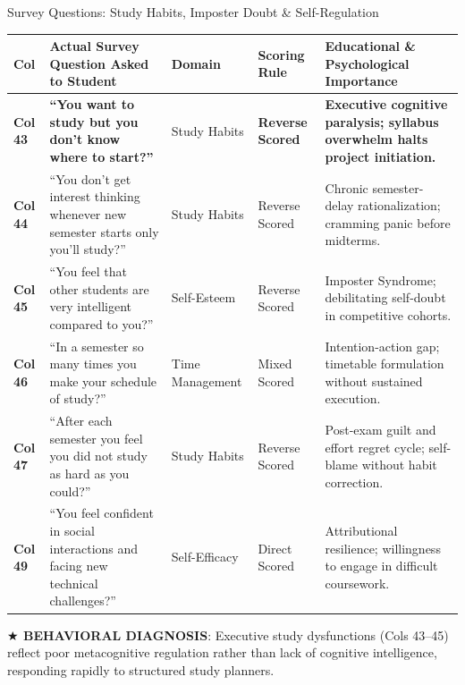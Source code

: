 \documentclass{beamer}
\begin{document}
\begin{frame}[t]{Survey Questions: Study Habits, Imposter Doubt \& Self-Regulation}
  \begin{tcolorbox}[colback=white, colframe=BlueDeep, arc=1.2mm, boxrule=0.7pt, top=0.3mm, bottom=0.3mm, left=0.8mm, right=0.8mm]
    \fontsize{4.2pt}{5.0pt}\selectfont
    \renewcommand{\arraystretch}{0.55}
    \begin{tabularx}{\linewidth}{@{}p{0.7cm} p{4.2cm} p{1.6cm} p{1.6cm} X@{}}
      \toprule
      \rowcolor{NavyDark}
      \textbf{\color{white}Col} & \textbf{\color{white}Actual Survey Question Asked to Student} & \textbf{\color{white}Domain} & \textbf{\color{white}Scoring Rule} & \textbf{\color{white}Educational \& Psychological Importance} \\
      \midrule
      \rowcolor{GoldBG} \textbf{Col 43} & \textbf{``You want to study but you don't know where to start?''} & Study Habits & \textbf{Reverse Scored} & \textbf{Executive cognitive paralysis; syllabus overwhelm halts project initiation.} \\
      \rowcolor{BlueLight} \textbf{Col 44} & ``You don't get interest thinking whenever new semester starts only you'll study?'' & Study Habits & Reverse Scored & Chronic semester-delay rationalization; cramming panic before midterms. \\
      \rowcolor{CanvasBG} \textbf{Col 45} & ``You feel that other students are very intelligent compared to you?'' & Self-Esteem & Reverse Scored & Imposter Syndrome; debilitating self-doubt in competitive cohorts. \\
      \rowcolor{BlueLight} \textbf{Col 46} & ``In a semester so many times you make your schedule of study?'' & Time Management & Mixed Scored & Intention-action gap; timetable formulation without sustained execution. \\
      \rowcolor{CanvasBG} \textbf{Col 47} & ``After each semester you feel you did not study as hard as you could?'' & Study Habits & Reverse Scored & Post-exam guilt and effort regret cycle; self-blame without habit correction. \\
      \rowcolor{BlueLight} \textbf{Col 49} & ``You feel confident in social interactions and facing new technical challenges?'' & Self-Efficacy & Direct Scored & Attributional resilience; willingness to engage in difficult coursework. \\
      \bottomrule
    \end{tabularx}
  \end{tcolorbox}
  \vspace{0.8mm}

  \begin{takeawaybanner}
    \fontsize{4.6pt}{5.6pt}\selectfont
    \textbf{\color{GoldPill}$\bigstar$ BEHAVIORAL DIAGNOSIS}: Executive study dysfunctions (Cols 43--45) reflect poor metacognitive regulation rather than lack of cognitive intelligence, responding rapidly to structured study planners.
  \end{takeawaybanner}
\end{frame}
\end{document}
